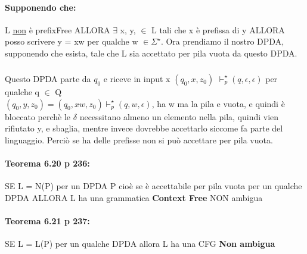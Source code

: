 \documentclass[12pt, a4paper, openany, oneside]{book}
\begin{document}
\paragraph{Supponendo che:} L \underline{\underline{non}} è prefixFree ALLORA $\exists$
x, y, $\in$ L tali che x è prefissa di y ALLORA posso scrivere y = xw per qualche w $\in \Sigma^{\star}$.
Ora prendiamo il nostro DPDA, supponendo che esista, tale che L sia accettato per pila vuota 
da questo DPDA. \\
\subparagraph{}	Questo DPDA parte da $q_{0}$ e riceve in input x $(q_{0}, x, z_{0})$ 
$\vdash^{\star}_{p} (q, \epsilon, \epsilon)$ per qualche q $\in$ Q\\
$(q_{0}, y, z_{0}) = (q_{0}, xw, z_{0}) \vdash^{\star}_{p} (q, w, \epsilon)$, ha w
ma la pila e vuota, e quindi è bloccato perchè le $\delta$ necessitano almeno
un elemento nella pila, quindi vien rifiutato y, e sbaglia, mentre invece dovrebbe
accettarlo siccome fa parte del linguaggio. Perciò se ha delle prefisse non si 
può accettare per pila vuota.
\paragraph{Teorema 6.20 p 236: }SE L = N(P) per un DPDA P cioè se è accettabile
per pila vuota per un qualche DPDA ALLORA L ha una grammatica \textbf{Context
Free} NON ambigua
\paragraph{Teorema 6.21 p 237: }SE L = L(P) per un qualche DPDA allora L ha una
CFG \textbf{Non ambigua}
\end{document}
